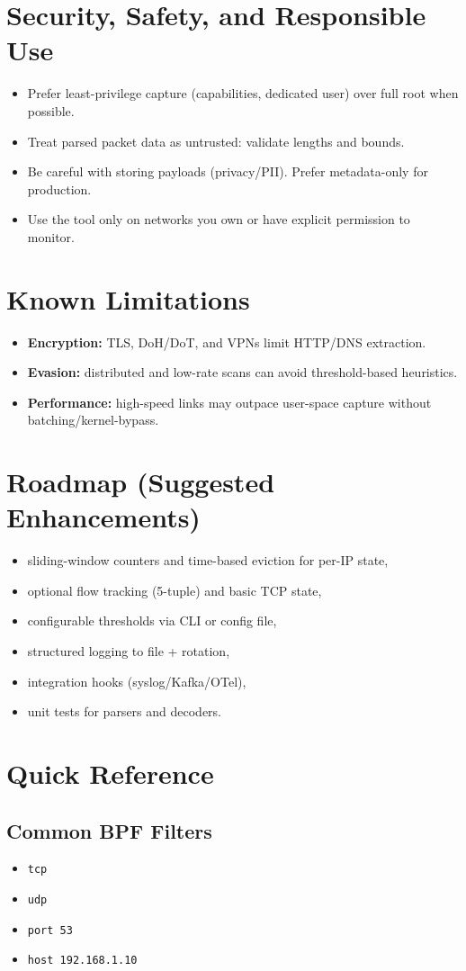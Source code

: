 \documentclass[14pt]{extarticle}
\begin{document}
\section{Security, Safety, and Responsible Use}
\begin{itemize}
  \item Prefer least-privilege capture (capabilities, dedicated user) over full root when possible.
  \item Treat parsed packet data as untrusted: validate lengths and bounds.
  \item Be careful with storing payloads (privacy/PII). Prefer metadata-only for production.
  \item Use the tool only on networks you own or have explicit permission to monitor.
\end{itemize}

\section{Known Limitations}
\begin{itemize}
  \item \textbf{Encryption:} TLS, DoH/DoT, and VPNs limit HTTP/DNS extraction.
  \item \textbf{Evasion:} distributed and low-rate scans can avoid threshold-based heuristics.
  \item \textbf{Performance:} high-speed links may outpace user-space capture without batching/kernel-bypass.
\end{itemize}

\section{Roadmap (Suggested Enhancements)}
\begin{itemize}
  \item sliding-window counters and time-based eviction for per-IP state,
  \item optional flow tracking (5-tuple) and basic TCP state,
  \item configurable thresholds via CLI or config file,
  \item structured logging to file + rotation,
  \item integration hooks (syslog/Kafka/OTel),
  \item unit tests for parsers and decoders.
\end{itemize}

\appendix
\section{Quick Reference}
\subsection{Common BPF Filters}
\begin{itemize}
  \item \texttt{tcp}
  \item \texttt{udp}
  \item \texttt{port 53}
  \item \texttt{host 192.168.1.10}
\end{itemize}



\end{document}
